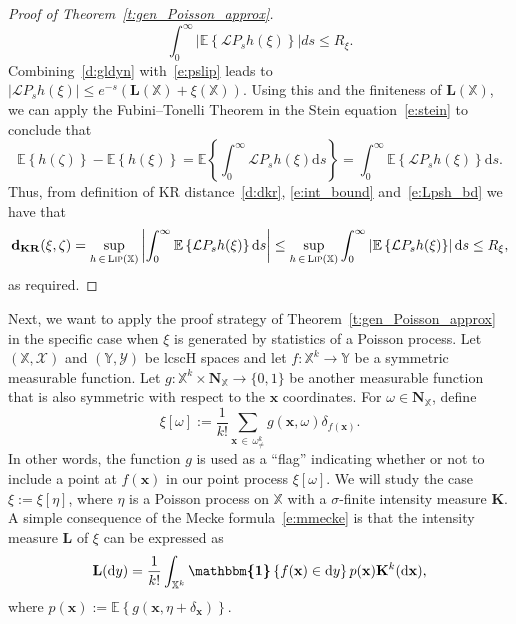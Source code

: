\documentclass[10pt]{amsart}
\theoremstyle{definition}\newtheorem{defi}[theo]{Definition}\newtheorem{rema}[theo]{Remark}\newtheorem{exam}[theo]{Example}\newtheorem{exem}[theo]{Example}\newtheorem{nota}[theo]{Notation}
\newcommand*\bL{\mathbf{L}}
\newcommand*\bN{\mathbf{N}}
\newcommand*\bK{\mathbf{K}}
\newcommand{\bx}{\mathbf{x}}
\newcommand*\dkr{\mathbf{d_{KR}}}
\newcommand*\X{\mathbb{X}}
\newcommand*\Y{\mathbb{Y}}
\newcommand{\E}{\mathbb{E}}
\newcommand*\cL{\mathcal{L}}
\newcommand*\cX{\mathcal{X}}
\newcommand*\cY{\mathcal{Y}}
\newcommand*\cLip{\textsc{Lip}}
\newcommand*\md{\mathrm{d}}
\newcommand{\mean}[1] {\E\left\{{#1}\right\}}
\newcommand{\ind}{\boldsymbol{\mathbbm{1}}}
\newcommand{\set}[1]{\left\{#1\right\}}
\begin{document}
\begin{proof}[Proof of Theorem~\ref{t:gen_Poisson_approx}]
\begin{equation}
\int_0^{\infty} \left|\mean{\cL P_sh(\xi)}\right|ds \leq R_{\xi}.
\end{equation}
Combining~\eqref{d:gldyn} with~\eqref{e:pslip} leads to $|\cL P_sh(\xi)| \leq e^{-s}(\bL(\X) + \xi(\X))$. Using this and the finiteness of $\bL(\X)$, we can apply the Fubini--Tonelli Theorem in the Stein equation~\eqref{e:stein} to conclude that
\begin{equation}\label{e:int_bound}
\mean{h(\zeta)} - \mean{h(\xi)} = \mean{\int_0^{\infty}\cL P_sh(\xi) \md s} = \int_0^{\infty}\mean{\cL P_sh(\xi)} \md s.
\end{equation}
Thus, from definition of KR distance~\eqref{d:dkr}, \eqref{e:int_bound} and~\eqref{e:Lpsh_bd} we have that
\begin{align*}
\dkr(\xi,\zeta) = \sup_{h\,\in\,\cLip(\X)} \left|\int_0^{\infty}\mean{\cL P_sh(\xi)} \md s\right|
\leq \sup_{h\,\in\,\cLip(\X)} \int_0^{\infty}\left|\mean{\cL P_sh(\xi)}\right| \md s \leq R_{\xi},
\end{align*}
as required.
\end{proof}

Next, we want to apply the proof strategy of Theorem~\ref{t:gen_Poisson_approx} in the specific case when $\xi$ is generated by statistics of a Poisson process. Let $(\X,\cX)$ and $(\Y,\cY)$ be lcscH spaces and let $f:\X^k \to \Y$ be a symmetric measurable function. Let $g : \X^k \times \bN_{\X} \to \{0,1\}$ be another measurable function that is also symmetric with respect to the $\bx$ coordinates. For $\omega\in \bN_{\X}$, define
\begin{equation}\label{e:defn_varphi}
\xi[\omega] := \frac{1}{k!}\sum_{\bx\,\in\, \omega^k_{\ne}}g(\bx,\omega)\delta_{f(\bx)}.
\end{equation}
In other words, the function $g$ is used as a ``flag'' indicating whether or not to include a point at $f(\bx)$ in our point process $\xi[\omega]$. We will study the case $\xi :=\xi[\eta]$, where $\eta$ is a Poisson process on $\X$ with a $\sigma$-finite intensity measure $\bK$. A simple consequence of the Mecke formula~\eqref{e:mmecke} is that the intensity measure $\bL$ of $\xi$ can be expressed as
\begin{equation}\label{e:int_L}
\bL(\md y) = \frac{1}{k!}\int_{\X^k} \ind\set{f(\bx) \in \md y} p(\bx) \bK^k(\md \bx),
\end{equation}
where $p(\bx) := \mean{g(\bx,\eta+\delta_{\bx})}$.
\end{document}
